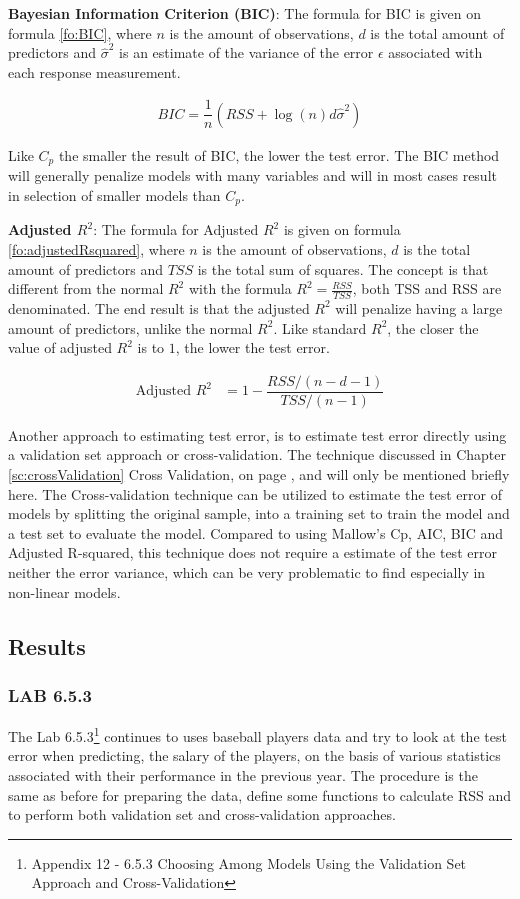 \textbf{Bayesian Information Criterion (BIC)}: The formula for BIC is given on formula \ref{fo:BIC}, where $n$ is the amount of observations, $d$ is the total amount of predictors and $\hat{\sigma}^2$ is an estimate of the variance of the error $\epsilon$ associated with each response measurement.

\begin{align}\label{fo:BIC}
BIC = \dfrac{1}{n} (RSS + \log(n) d \hat{\sigma}^2)
\end{align}

Like $C_p$ the smaller the result of BIC, the lower the test error. The BIC method will generally penalize models with many variables and will in most cases result in selection of smaller models than $C_p$.

\textbf{Adjusted $R^2$}: The formula for Adjusted $R^2$ is given on formula \ref{fo:adjustedRsquared}, where $n$ is the amount of observations, $d$ is the total amount of predictors and $TSS$ is the total sum of squares. The concept is that different from the normal $R^2$ with the formula $R^2 = \tfrac{RSS}{TSS}$, both TSS and RSS  are denominated. The end result is that the adjusted $R^2$ will penalize having a large amount of predictors, unlike the normal $R^2$. Like standard $R^2$, the closer the value of adjusted $R^2$ is to $1$, the lower the test error.

\begin{align}\label{fo:adjustedRsquared}
	\text{Adjusted } R^2 &= 1 - \dfrac{RSS/(n-d-1)}{TSS/(n-1)}
\end{align}

Another approach to estimating test error, is to estimate test error directly using a validation set approach or cross-validation. The technique discussed in Chapter \ref{sc:crossValidation} Cross Validation, on page \pageref{sc:crossValidation}, and will only be mentioned briefly here. The Cross-validation technique can be utilized to estimate the test error of models by splitting the original sample, into a training set to train the model and a test set to evaluate the model. Compared to using Mallow's Cp, AIC, BIC and Adjusted R-squared, this technique does not require a estimate of the test error neither the error variance, which can be very problematic to find especially in non-linear models.

\subsection{Results}
\subsubsection*{LAB 6.5.3}
The Lab 6.5.3\footnote{Appendix 12 - 6.5.3 Choosing Among Models Using the Validation Set Approach and Cross-Validation} continues to uses baseball players data and try to look at the test error when predicting, the salary of the players, on the basis of various statistics associated with their performance in the previous year. The procedure is the same as before for preparing the data, define some functions to calculate RSS and to perform both validation set and cross-validation approaches.

